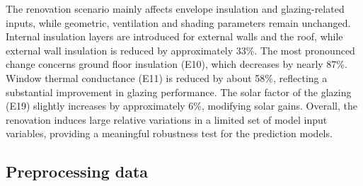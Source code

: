 \documentclass{article}
\begin{document}
The renovation scenario mainly affects envelope insulation and glazing-related
inputs, while geometric, ventilation and shading parameters remain unchanged.
Internal insulation layers are introduced for external walls and the roof, while
external wall insulation is reduced by approximately 33\%. The most pronounced
change concerns ground floor insulation (E10), which decreases by nearly 87\%.
Window thermal conductance (E11) is reduced by about 58\%, reflecting a
substantial improvement in glazing performance. The solar factor of the glazing
(E19) slightly increases by approximately 6\%, modifying solar gains. Overall,
the renovation induces large relative variations in a limited set of model input
variables, providing a meaningful robustness test for the prediction models.

\begin{figure}[H]
\centering
{}
\label{fig:renovation_deltas}
\end{figure}

\subsection{Preprocessing data}
\end{document}
